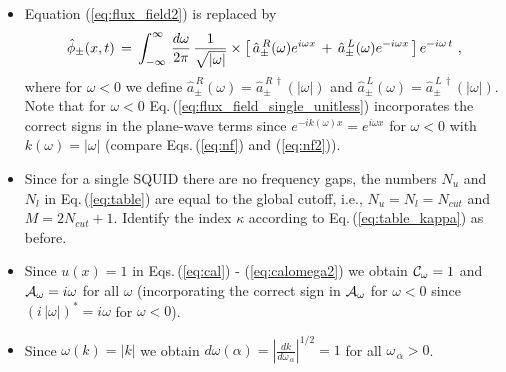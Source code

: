 \begin{itemize}
\item
Equation (\ref{eq:flux_field2}) is replaced by 
%
\begin{equation} \label{eq:flux_field_single_unitless}
    \hat{\phi}_{\pm}(x,t) \, = \, 
    \displaystyle{
    \int_{-\infty}^{\infty} \, \frac{d\omega}{2 \pi} \,
        \frac{1}{\sqrt{|\omega|}}} \\[1mm]
    \times \left[ \, \hat{a}_{\pm}^{\,R}(\omega) e^{i \omega x} \, + \, 
      \hat{a}_{\pm}^{\,L}(\omega) e^{-i \omega x}  \, \right] e^{-i \omega \, t} \, \, ,
\end{equation}
%
where for $\omega < 0$ we define
$\hat{a}_{\pm}^{\,R}(\omega) = \hat{a}_{\pm}^{\,R\,\dagger}(|\omega|)$ and 
$\hat{a}_{\pm}^{\,L}(\omega) = \hat{a}_{\pm}^{\,L\,\dagger}(|\omega|)$.
Note that for $\omega < 0$ Eq.\,(\ref{eq:flux_field_single_unitless}) incorporates the correct signs
in the plane-wave terms since 
$e^{- i k(\omega) x} = e^{i \omega x}$ for $\omega < 0$
with $k(\omega) = |\omega|$ (compare Eqs.\,(\ref{eq:nf}) and (\ref{eq:nf2})). 

\item
Since for a single SQUID there are no frequency gaps, 
the numbers $N_u$ and $N_l$ in Eq.\,(\ref{eq:table}) are equal to the global cutoff, 
i.e., $N_u = N_l = N_{cut}$ and $M = 2 N_{cut} + 1$. 
Identify the index $\kappa$ according to Eq.\,(\ref{eq:table_kappa}) as before. 


\item Since $u(x) = 1$ in Eqs.\,(\ref{eq:cal}) - (\ref{eq:calomega2}) we obtain 
${\cal C}_{\omega} = 1$ and ${\cal A}_{\omega} = i \omega$ for all $\omega$
(incorporating the correct sign in ${\cal A}_{\omega}$ for $\omega<0$ 
since $(i \, |\omega|)^* = i \omega$ for $\omega < 0$).

\item Since $\omega(k) = |k|$ we obtain
$d\omega(\alpha) = \displaystyle{\left|\frac{dk}{d\omega_{\,\alpha}} \right|^{1/2}} = 1$
for all $\omega_{\,\alpha} > 0$.


\end{itemize}
